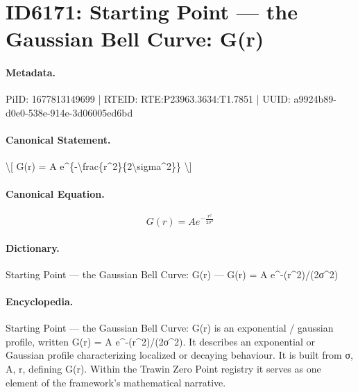 \section*{ID6171: Starting Point — the Gaussian Bell Curve: G(r)}
\paragraph{Metadata.}
PiID: 1677813149699 | RTEID: RTE:P23963.3634:T1.7851 | UUID: a9924b89-d0e0-538e-914e-3d06005ed6bd

\paragraph{Canonical Statement.}
\textbackslash{}[ G(r) = A e\textasciicircum{}\{-\textbackslash{}frac\{r\textasciicircum{}2\}\{2\textbackslash{}sigma\textasciicircum{}2\}\} \textbackslash{}]

\paragraph{Canonical Equation.}
\[
G(r) = A e^{-\frac{r^2}{2\sigma^2}}
\]

\paragraph{Dictionary.}
Starting Point — the Gaussian Bell Curve: G(r) — G(r) = A e\textasciicircum{}-(r\textasciicircum{}2)/(2σ\textasciicircum{}2)

\paragraph{Encyclopedia.}
Starting Point — the Gaussian Bell Curve: G(r) is an exponential / gaussian profile, written G(r) = A e\textasciicircum{}-(r\textasciicircum{}2)/(2σ\textasciicircum{}2). It describes an exponential or Gaussian profile characterizing localized or decaying behaviour. It is built from σ, A, r, defining G(r). Within the Trawin Zero Point registry it serves as one element of the framework's mathematical narrative.

